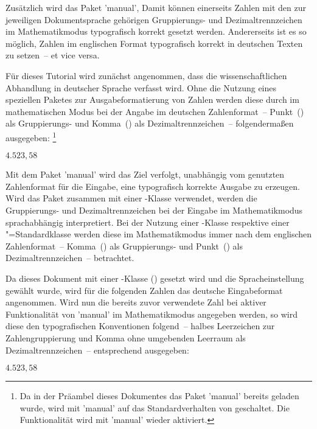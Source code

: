 \documentclass[english,ngerman]{tudscrartcl}
\begin{document}
\begin{Entity}{}
\begin{Preamble}
\end{Preamble}
%
Zusätzlich wird das Paket 'manual', Damit können einerseits 
Zahlen mit den zur jeweiligen Dokumentsprache gehörigen Gruppierungs- und 
Dezimaltrennzeichen im Mathematikmodus typografisch korrekt gesetzt werden. 
Andererseits ist es so möglich, Zahlen im englischen Format typografisch 
korrekt in deutschen Texten zu setzen~-- et vice versa.
%
\begin{Preamble}
\usepackage{mathswap}
\end{Preamble}
%
%
Für dieses Tutorial wird zunächst angenommen, dass die wissenschaftlichen 
Abhandlung in deutscher Sprache verfasst wird. Ohne die Nutzung eines 
speziellen Paketes zur Ausgabeformatierung von Zahlen werden diese durch 
 im mathematischen Modus bei der Angabe im deutschen 
Zahlenformat~-- Punkt~() als Gruppierungs- und Komma~(\PValue{,}) als 
Dezimaltrennzeichen~-- folgendermaßen ausgegeben:%
\footnote{%
  Da in der Präambel dieses Dokumentes das Paket 'manual' 
  bereits geladen wurde, wird mit 'manual' auf das 
  Standardverhalten von  geschaltet. Die Funktionalität wird mit 
  'manual' wieder aktiviert.%
}
%
\begin{Trunk*}
\mathswapoff
\(4.523,58\)
\mathswapon

\end{Trunk*}
%
Mit dem Paket 'manual' wird das Ziel verfolgt, unabhängig vom 
genutzten Zahlenformat für die Eingabe, eine typografisch korrekte Ausgabe zu 
erzeugen. Wird das Paket zusammen mit einer \TUDScript-Klasse verwendet, werden 
die Gruppierungs- und Dezimaltrennzeichen bei der Eingabe im Mathematikmodus 
sprachabhängig interpretiert. Bei der Nutzung einer \KOMAScript-Klasse 
respektive einer "=Standardklasse werden diese im Mathematikmodus 
immer nach dem englischen Zahlenformat~-- Komma~(\PValue{,}) als Gruppierungs- 
und Punkt~(\PValue{,}) als Dezimaltrennzeichen~-- betrachtet.

Da dieses Dokument mit einer \TUDScript-Klasse (\TUDClassName) gesetzt wird und 
die Spracheinstellung~ gewählt wurde, wird für die folgenden 
Zahlen das deutsche Eingabeformat angenommen. Wird nun die bereits zuvor 
verwendete Zahl bei aktiver Funktionalität von 'manual' im 
Mathematikmodus angegeben werden, so wird diese den typografischen Konventionen 
folgend~-- halbes Leerzeichen zur Zahlengruppierung und Komma ohne umgebenden 
Leerraum als Dezimaltrennzeichen~-- entsprechend ausgegeben:
%
\begin{Trunk*}
\(4.523,58\)


\end{Trunk*}
\end{Entity}
\end{document}
